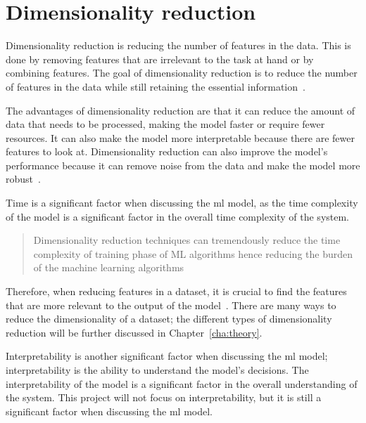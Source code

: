 

\section{Dimensionality reduction}\label{sec:dimensionality-reduction-problem}

Dimensionality reduction is reducing the number of features in the data. This is done by removing features that are irrelevant to the task at hand or by combining features. The goal of dimensionality reduction is to reduce the number of features in the data while still retaining the essential information~\cite{dimensionality-reduction-cheng}.

The advantages of dimensionality reduction are that it can reduce the amount of data that needs to be processed, making the model faster or require fewer resources. It can also make the model more interpretable because there are fewer features to look at. Dimensionality reduction can also improve the model's performance because it can remove noise from the data and make the model more robust~\cite{dimensionality-reduction-cheng}.

Time is a significant factor when discussing the \gls{ml} model, as the time complexity of the model is a significant factor in the overall time complexity of the system.

\blockcquote{Analysis-of-Dimensionality-Reduction-Techniques-on-Big-Data}{Dimensionality reduction techniques can tremendously reduce the time complexity of training phase of ML algorithms hence reducing the burden of the machine learning algorithms}.

Therefore, when reducing features in a dataset, it is crucial to find the features that are more relevant to the output of the model~\cite{Feature-engineering-zheng}. There are many ways to reduce the dimensionality of a dataset; the different types of dimensionality reduction will be further discussed in Chapter~\ref{cha:theory}.



Interpretability is another significant factor when discussing the \gls{ml} model; interpretability is the ability to understand the model's decisions. The interpretability of the model is a significant factor in the overall understanding of the system. This project will not focus on interpretability, but it is still a significant factor when discussing the \gls{ml} model.
